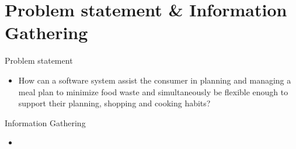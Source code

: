 \section{Problem statement \& Information Gathering} 
\begin{frame}{Problem statement}
    \begin{itemize}
        \item How can a software system assist the consumer in planning and managing a meal plan to minimize food waste and simultaneously be flexible enough to support their planning, shopping and cooking habits?
    \end{itemize}
\end{frame}

\begin{frame}{Information Gathering}
    \begin{itemize}
        \item 
    \end{itemize}
\end{frame}

